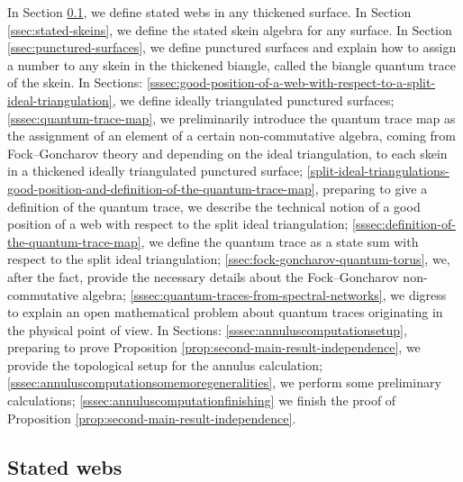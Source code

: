 \documentclass[12pt,
	]{amsart}
\theoremstyle{definition}
\begin{document}
In Section \ref{ssec:stated-webs}, we define stated webs in any thickened surface.  In Section \ref{ssec:stated-skeins}, we define the stated skein algebra for any surface.  In Section \ref{ssec:punctured-surfaces}, we define punctured surfaces and explain how to assign a number to any skein in the thickened biangle, called the biangle quantum trace of the skein.  In Sections:  \ref{sssec:good-position-of-a-web-with-respect-to-a-split-ideal-triangulation}, we define ideally triangulated punctured surfaces; \ref{sssec:quantum-trace-map}, we preliminarily introduce the quantum trace map as the assignment of an element of a certain non-commutative algebra, coming from Fock--Goncharov theory and depending on the ideal triangulation, to each skein in a thickened ideally triangulated punctured surface; \ref{split-ideal-triangulations-good-position-and-definition-of-the-quantum-trace-map}, preparing to give a definition of the quantum trace, we describe the technical notion of a good position of a web with respect to the split ideal triangulation; \ref{sssec:definition-of-the-quantum-trace-map}, we define the quantum trace as a state sum with respect to the split ideal triangulation; \ref{ssec:fock-goncharov-quantum-torus}, we, after the fact, provide the necessary details about the Fock--Goncharov non-commutative algebra; \ref{sssec:quantum-traces-from-spectral-networks}, we digress to explain an open mathematical problem about quantum traces originating in the physical point of view.  In Sections:  \ref{sssec:annuluscomputationsetup}, preparing to prove Proposition \ref{prop:second-main-result-independence}, we provide the topological setup for the annulus calculation; \ref{sssec:annuluscomputationsomemoregeneralities}, we perform some preliminary calculations; \ref{sssec:annuluscomputationfinishing} we finish the proof of Proposition \ref{prop:second-main-result-independence}.  

\subsection{Stated webs}\label{ssec:stated-webs}
\end{document}
